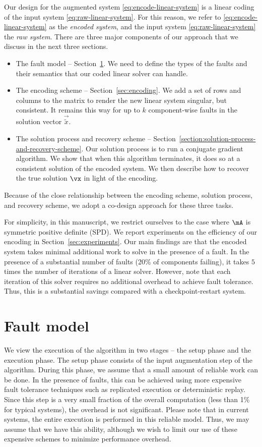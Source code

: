 \documentclass[11pt]{article}
\newcommand{\tx}{\vec{\tilde{x}}}
\begin{document}
Our design for the augmented system \eqref{eq:encode-linear-system} is a linear
coding of the input system \eqref{eq:raw-linear-system}. For this reason, we refer
to \eqref{eq:encode-linear-system} as the \textit{encoded system}, and the input
system \eqref{eq:raw-linear-system} the \textit{raw system}. There are three major
components of our approach that we discuss in the next three sections. 
\begin{itemize}
\item The fault model -- Section~\ref{sec:fault}. We need to define the types of the
faults and their semantics that our coded linear solver can handle.
\item The encoding scheme -- Section~\ref{sec:encoding}. We add a set of rows
and columns to the matrix to render the new linear system singular, but consistent.
It remains this way for up to $k$ component-wise faults in the solution vector $\tx$.
\item The solution process and recovery scheme --
Section~\ref{section:solution-process-and-recovery-scheme}. Our solution process
is to run a conjugate gradient algorithm. We show that when this algorithm terminates,
it does so at a consistent solution of the encoded system. We then describe how to
recover the true solution $\vx$ in light of the encoding.
\end{itemize}
Because of the close relationship between the encoding scheme, solution process, and
recovery scheme, we adopt a co-design approach for these three tasks. 

For simplicity, in this manuscript, we restrict ourselves to the case where $\mA$
is symmetric positive definite (SPD). We report experiments on the efficiency of
our encoding in Section~\ref{sec:experiments}. Our main findings are that the
encoded system takes minimal additional work to solve in the presence of a fault.
In the presence of a substantial number of faults (20\% of components failing), it
takes $5$ times the number of iterations of a linear solver. However, note that each
iteration of this solver requires no additional overhead to achieve fault tolerance.
Thus, this is a substantial savings compared with a checkpoint-restart system. 

\section{Fault model} \label{sec:fault}

We view the execution of the algorithm in two stages -- the setup phase and the execution
phase. The setup phase consists of the input augmentation step of the algorithm. During
this phase, we assume that a small amount of reliable work can be done. In the presence of
faults, this can be achieved using more expensive fault tolerance techniques such as
replicated execution or deterministic replay. Since this step is a very small fraction of
the overall computation (less than 1\% for typical systems), the overhead is not 
significant. Please note that in current systems, the entire execution
is performed in this reliable model. Thus, we may assume that we have
this ability, although we wish to limit our use of these expensive schemes to minimize
performance overhead.
\end{document}

